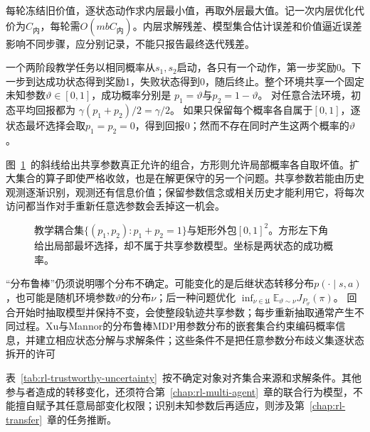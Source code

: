 每轮冻结旧价值，逐状态动作求内层最小值，再取外层最大值。记一次内层优化代价为$C_{\text{内}}$，每轮需$O(mbC_{\text{内}})$。内层求解残差、模型集合估计误差和价值逼近误差影响不同步骤，应分别记录，不能只报告最终迭代残差。

\begin{example}[共享参数不能随状态独立取坏值]
  \label{ex:rl-trustworthy-coupling}
  一个两阶段教学任务以相同概率从$s_1,s_2$启动，各只有一个动作，第一步奖励0。下一步到达成功状态得到奖励1，失败状态得到0，随后终止。整个环境共享一个固定未知参数$\vartheta\in[0,1]$，成功概率分别是
  $p_1=\vartheta$与$p_2=1-\vartheta$。
  对任意合法环境，初态平均回报都为
  $\gamma(p_1+p_2)/2=\gamma/2$。
  如果只保留每个概率各自属于$[0,1]$，逐状态最坏选择会取$p_1=p_2=0$，得到回报0；然而不存在同时产生这两个概率的$\vartheta$。
\end{example}

图~\ref{fig:rl-trustworthy-rectangular}~的斜线给出共享参数真正允许的组合，方形则允许局部概率各自取坏值。扩大集合的算子即使严格收敛，也是在解更保守的另一个问题。共享参数若能由历史观测逐渐识别，观测还有信息价值；保留参数信念或相关历史才能利用它，将每次访问都当作对手重新任意选参数会丢掉这一机会。

\begin{figure}[htbp]
  \centering
  
  \caption{教学耦合集$\{(p_1,p_2):p_1+p_2=1\}$与矩形外包$[0,1]^2$。方形左下角给出局部最坏选择，却不属于共享参数模型。坐标是两状态的成功概率。}
  \label{fig:rl-trustworthy-rectangular}
\end{figure}

“分布鲁棒”仍须说明哪个分布不确定。可能变化的是后继状态转移分布$p(\cdot\mid s,a)$，也可能是随机环境参数$\vartheta$的分布$\nu$；后一种问题优化
$\inf_{\nu\in\mathfrak U}\mathbb E_{\vartheta\sim\nu}J_{P_\vartheta}(\pi)$。
回合开始时抽取模型并保持不变，会使整段轨迹共享参数；每步重新抽取通常产生不同过程。Xu与Mannor的分布鲁棒MDP用参数分布的嵌套集合约束编码概率信息，并建立相应状态分解与求解条件；这些条件不是把任意参数分布歧义集逐状态拆开的许可

表~\ref{tab:rl-trustworthy-uncertainty}~按不确定对象对齐集合来源和求解条件。其他参与者造成的转移变化，还须符合第~\ref{chap:rl-multi-agent}~章的联合行为模型，不能擅自赋予其任意局部变化权限；识别未知参数后再适应，则涉及第~\ref{chap:rl-transfer}~章的任务推断。

